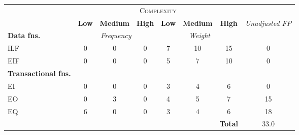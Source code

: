 
\begin{tabular}{|l|c|c|c|c|c|c|c|}
\cline{2-7}
\multicolumn{1}{c}{} & \multicolumn{6}{|c|}{\textsc{Complexity}} & \multicolumn{1}{c}{}  \\ \cline{2-8}
\multicolumn{1}{c|}{} & \textbf{Low} & \textbf{Medium} & \textbf{High} & \textbf{Low} & \textbf{Medium} & \textbf{High} & \multirow{2}{*}{\textit{Unadjusted FP}} \\ \cline{1-7}
\textbf{Data fns.} & \multicolumn{3}{|c|}{\textit{Frequency}} &  \multicolumn{3}{|c|}{\textit{Weight}} & \\ \hline
ILF 	& 0 & 0 & 0 & 7 & 10 & 15 & 0 	\\ \hline
EIF 	& 0 & 0 & 0 & 5 & 7 & 10 & 0		\\ \hline
\textbf{Transactional fns.} & \multicolumn{7}{|c|}{} \\ \hline
EI 		& 0 & 0 & 0 & 3 & 4 & 6 & 0 		\\ \hline
EO 		& 0 & 3 & 0 & 4 & 5 & 7 & 15		\\ \hline
EQ		& 6 & 0 & 0 & 3 & 4 & 6 & 18		\\ \hline
\multicolumn{6}{c|}{} & \textbf{Total} & 33.0 \\ \cline{7-8}
\end{tabular}
